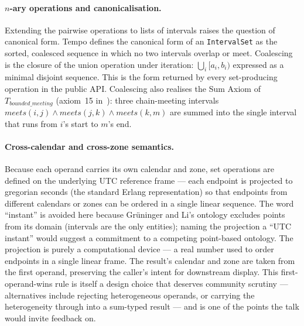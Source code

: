 \paragraph*{$n$-ary operations and canonicalisation.} Extending the
pairwise operations to lists of intervals raises the question of
canonical form. Tempo defines the canonical form of an
\texttt{IntervalSet} as the sorted, coalesced sequence in which no two
intervals overlap or meet. Coalescing is the closure of the union
operation under iteration: $\bigcup_i [a_i, b_i)$ expressed as a
minimal disjoint sequence. This is the form returned by every
set-producing operation in the public API. Coalescing also realises
the Sum Axiom of $T_{bounded\_meeting}$ (axiom~15
in~\cite{gruninger2017allenontology}): three chain-meeting intervals
$\textit{meets}(i,j) \land \textit{meets}(j,k) \land \textit{meets}(k,m)$
are summed into the single interval that runs from $i$'s start to
$m$'s end.

\paragraph*{Cross-calendar and cross-zone semantics.} Because each
operand carries its own calendar and zone, set operations are
defined on the underlying UTC reference frame --- each endpoint is
projected to gregorian seconds (the standard Erlang representation)
so that endpoints from different calendars or zones can be ordered
in a single linear sequence. The word ``instant'' is avoided here
because Gr\"uninger and Li's ontology excludes points from its
domain (intervals are the only entities); naming the projection a
``UTC instant'' would suggest a commitment to a competing
point-based ontology. The projection is purely a computational
device --- a real number used to order endpoints in a single linear
frame. The result's calendar and zone are taken from the first
operand, preserving the caller's intent for downstream display.
This first-operand-wins rule is itself a design choice that deserves
community scrutiny --- alternatives include rejecting heterogeneous
operands, or carrying the heterogeneity through into a sum-typed
result --- and is one of the points the talk would invite feedback
on.

